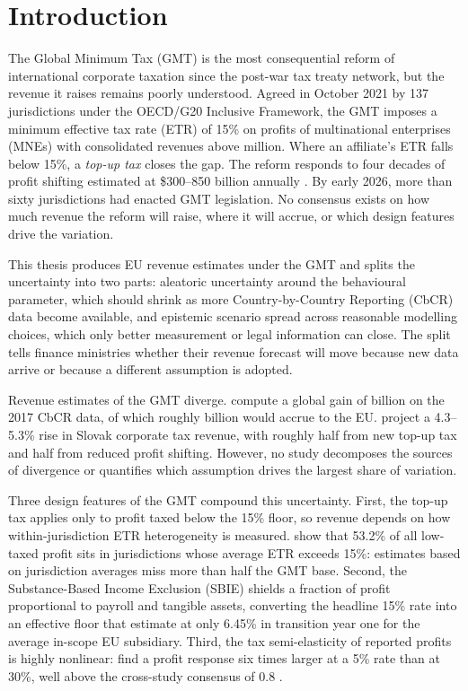\documentclass[11pt,a4paper]{article}
\newcommand{\EUR}{\texteuro}
\begin{document}
\newpage

\section{Introduction}\label{sec:introduction}

The Global Minimum Tax (GMT) is the most consequential reform of international corporate taxation since the post-war tax treaty network, but the revenue it raises remains poorly understood. Agreed in October 2021 by 137 jurisdictions under the OECD/G20 Inclusive Framework, the GMT imposes a minimum effective tax rate (ETR) of 15\% on profits of multinational enterprises (MNEs) with consolidated revenues above \EUR750 million. Where an affiliate's ETR falls below 15\%, a \emph{top-up tax} closes the gap. The reform responds to four decades of profit shifting estimated at \$300--850 billion annually \citep{torslov2023,garcia-bernardo2024,blouin2023,cobham2018}. By early 2026, more than sixty jurisdictions had enacted GMT legislation. No consensus exists on how much revenue the reform will raise, where it will accrue, or which design features drive the variation.

This thesis produces EU revenue estimates under the GMT and splits the uncertainty into two parts: aleatoric uncertainty around the behavioural parameter, which should shrink as more Country-by-Country Reporting (CbCR) data become available, and epistemic scenario spread across reasonable modelling choices, which only better measurement or legal information can close. The split tells finance ministries whether their revenue forecast will move because new data arrive or because a different assumption is adopted.

Revenue estimates of the GMT diverge. \citet{barake2022} compute a global gain of \EUR179 billion on the 2017 CbCR data, of which roughly \EUR55 billion would accrue to the EU. \citet{boukal2026} project a 4.3--5.3\% rise in Slovak corporate tax revenue, with roughly half from new top-up tax and half from reduced profit shifting. However, no study decomposes the sources of divergence or quantifies which assumption drives the largest share of variation.

Three design features of the GMT compound this uncertainty. First, the top-up tax applies only to profit taxed below the 15\% floor, so revenue depends on how within-jurisdiction ETR heterogeneity is measured. \citet{hugger2026} show that 53.2\% of all low-taxed profit sits in jurisdictions whose average ETR exceeds 15\%: estimates based on jurisdiction averages miss more than half the GMT base. Second, the Substance-Based Income Exclusion (SBIE) shields a fraction of profit proportional to payroll and tangible assets, converting the headline 15\% rate into an effective floor that \citet{devereux2023} estimate at only 6.45\% in transition year one for the average in-scope EU subsidiary. Third, the tax semi-elasticity of reported profits is highly nonlinear: \citet{dowd2017} find a profit response six times larger at a 5\% rate than at 30\%, well above the cross-study consensus of 0.8 \citep{heckemeyer2017}.
\end{document}
